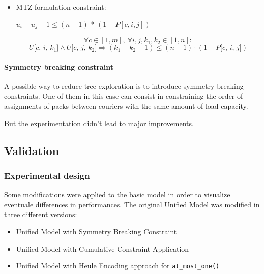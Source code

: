 \begin{itemize}
\begin{itemize}
\begin{itemize}
            \item MTZ formulation constraint:
            \begin{center}
                $u_i - u_j + 1 \leq (n - 1)$ * $(1 - P[c, i, j] )$
            \end{center}
            \begin{equation}
                \label{eq:subtour_constr5}
                \forall c \in [1, m], \ \forall i, j, k_1, k_2 \in [1, n]: 
            \end{equation}
            \[
                U\texttt{[$c$, $i$, $k_1$]} \land U\texttt{[$c$, $j$, $k_2$]} \Rightarrow
                (k_1 - k_2 + 1) \leq (n-1) \cdot (1 - P\texttt{[$c$, $i$, $j$]})
            \]
        \end{itemize}
    \end{itemize}
\end{itemize}

\paragraph*{Symmetry breaking constraint}

A possible way to reduce tree exploration is to introduce symmetry breaking constraints.
One of them in this case can consist in constraining the order of assignments of packs between couriers with the same amount of load capacity.

But the experimentation didn't lead to major improvements.

\subsection{Validation}

\subsubsection*{Experimental design}

Some modifications were applied to the basic model in order to visualize eventuale differences in performances.
The original Unified Model was modified in three different versions:
\begin{itemize}
    \item Unified Model with Symmetry Breaking Constraint
    \item Unified Model with Cumulative Constraint Application
    \item Unified Model with Heule Encoding approach for \texttt{at\_most\_one()}
\end{itemize}

